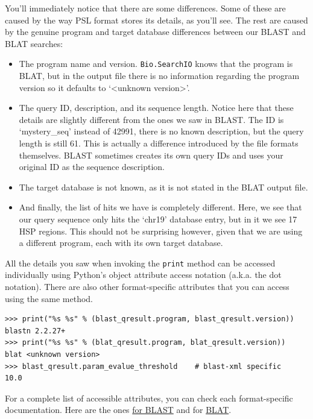 \documentclass{report}
\begin{document}
You'll immediately notice that there are some differences. Some of these are
caused by the way PSL format stores its details, as you'll see. The rest are
caused by the genuine program and target database differences between our BLAST
and BLAT searches:

\begin{itemize}
\item The program name and version. \verb|Bio.SearchIO| knows that the program
    is BLAT, but in the output file there is no information regarding the
    program version so it defaults to `<unknown version>'.
\item The query ID, description, and its sequence length. Notice here that these
    details are slightly different from the ones we saw in BLAST. The ID is
    `mystery\_seq' instead of 42991, there is no known description, but the query
    length is still 61. This is actually a difference introduced by the file
    formats themselves. BLAST sometimes creates its own query IDs and uses your
    original ID as the sequence description.
\item The target database is not known, as it is not stated in the BLAT output
    file.
\item And finally, the list of hits we have is completely different. Here, we
    see that our query sequence only hits the `chr19' database entry, but in it
    we see 17 HSP regions. This should not be surprising however, given that we
    are using a different program, each with its own target database.
\end{itemize}

All the details you saw when invoking the \verb|print| method can be accessed
individually using Python's object attribute access notation (a.k.a. the dot
notation). There are also other format-specific attributes that you can access
using the same method.

\begin{verbatim}
>>> print("%s %s" % (blast_qresult.program, blast_qresult.version))
blastn 2.2.27+
>>> print("%s %s" % (blat_qresult.program, blat_qresult.version))
blat <unknown version>
>>> blast_qresult.param_evalue_threshold    # blast-xml specific
10.0
\end{verbatim}

For a complete list of accessible attributes, you can check each format-specific
documentation. Here are the ones
\href{http://biopython.org/DIST/docs/api/Bio.SearchIO.BlastIO-module.html}{for BLAST}
and for
\href{http://biopython.org/DIST/docs/api/Bio.SearchIO.BlatIO-module.html}{BLAT}.
\end{document}
